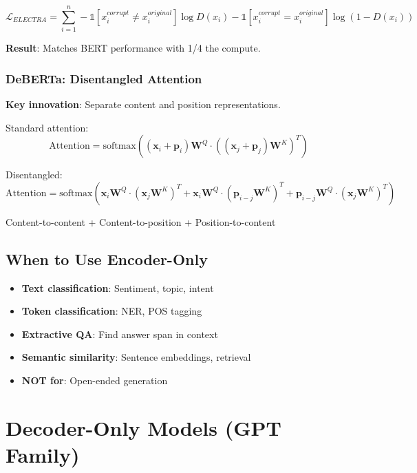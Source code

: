 \begin{equation}
\mathcal{L}_{ELECTRA} = \sum_{i=1}^{n} -\mathbb{1}[x_i^{corrupt} \neq x_i^{original}] \log D(x_i) - \mathbb{1}[x_i^{corrupt} = x_i^{original}] \log(1 - D(x_i))
\end{equation}

\textbf{Result}: Matches BERT performance with 1/4 the compute.

\subsubsection{DeBERTa: Disentangled Attention}

\textbf{Key innovation}: Separate content and position representations.

Standard attention:
\begin{equation}
\text{Attention} = \text{softmax}((\mathbf{x}_i + \mathbf{p}_i)\mathbf{W}^Q \cdot ((\mathbf{x}_j + \mathbf{p}_j)\mathbf{W}^K)^T)
\end{equation}

Disentangled:
\begin{equation}
\text{Attention} = \text{softmax}(\mathbf{x}_i\mathbf{W}^Q \cdot (\mathbf{x}_j\mathbf{W}^K)^T + \mathbf{x}_i\mathbf{W}^Q \cdot (\mathbf{p}_{i-j}\mathbf{W}^K)^T + \mathbf{p}_{i-j}\mathbf{W}^Q \cdot (\mathbf{x}_j\mathbf{W}^K)^T)
\end{equation}

Content-to-content + Content-to-position + Position-to-content

\subsection{When to Use Encoder-Only}

\begin{itemize}
    \item \textbf{Text classification}: Sentiment, topic, intent
    \item \textbf{Token classification}: NER, POS tagging
    \item \textbf{Extractive QA}: Find answer span in context
    \item \textbf{Semantic similarity}: Sentence embeddings, retrieval
    \item \textbf{NOT for}: Open-ended generation
\end{itemize}

\section{Decoder-Only Models (GPT Family)}
\label{sec:decoder_only}

